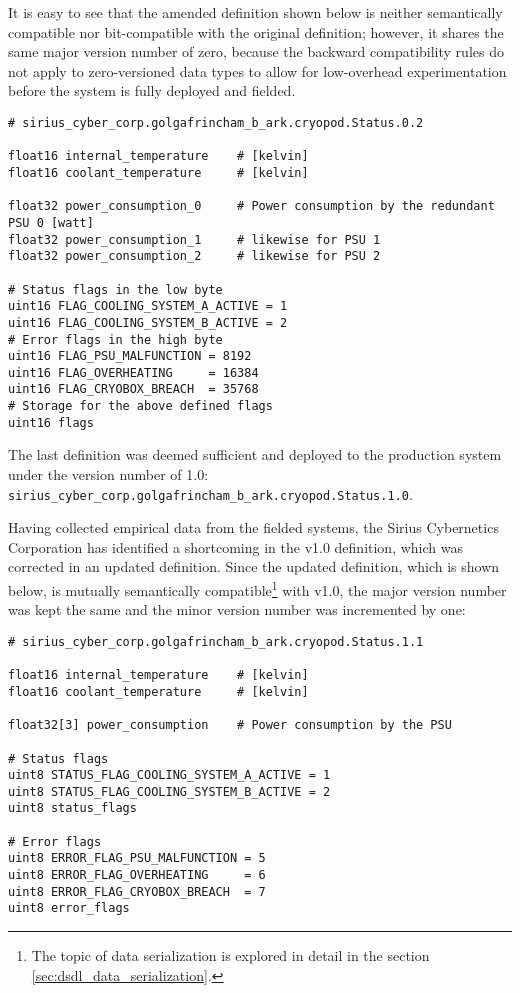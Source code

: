 It is easy to see that the amended definition shown below is neither semantically compatible nor bit-compatible
with the original definition; however, it shares the same major version number of zero, because the backward
compatibility rules do not apply to zero-versioned data types to allow for low-overhead experimentation
before the system is fully deployed and fielded.

\begin{verbatim}
# sirius_cyber_corp.golgafrincham_b_ark.cryopod.Status.0.2

float16 internal_temperature    # [kelvin]
float16 coolant_temperature     # [kelvin]

float32 power_consumption_0     # Power consumption by the redundant PSU 0 [watt]
float32 power_consumption_1     # likewise for PSU 1
float32 power_consumption_2     # likewise for PSU 2

# Status flags in the low byte
uint16 FLAG_COOLING_SYSTEM_A_ACTIVE = 1
uint16 FLAG_COOLING_SYSTEM_B_ACTIVE = 2
# Error flags in the high byte
uint16 FLAG_PSU_MALFUNCTION = 8192
uint16 FLAG_OVERHEATING     = 16384
uint16 FLAG_CRYOBOX_BREACH  = 35768
# Storage for the above defined flags
uint16 flags
\end{verbatim}

The last definition was deemed sufficient and deployed to the production system
under the version number of 1.0: \verb|sirius_cyber_corp.golgafrincham_b_ark.cryopod.Status.1.0|.

Having collected empirical data from the fielded systems, the Sirius Cybernetics Corporation has
identified a shortcoming in the v1.0 definition, which was corrected in an updated definition.
Since the updated definition, which is shown below, is mutually semantically
compatible\footnote{The topic of data serialization is explored in detail in the section
\ref{sec:dsdl_data_serialization}.}
with v1.0, the major version number was kept the same and the minor version number was incremented by one:

\begin{verbatim}
# sirius_cyber_corp.golgafrincham_b_ark.cryopod.Status.1.1

float16 internal_temperature    # [kelvin]
float16 coolant_temperature     # [kelvin]

float32[3] power_consumption    # Power consumption by the PSU

# Status flags
uint8 STATUS_FLAG_COOLING_SYSTEM_A_ACTIVE = 1
uint8 STATUS_FLAG_COOLING_SYSTEM_B_ACTIVE = 2
uint8 status_flags

# Error flags
uint8 ERROR_FLAG_PSU_MALFUNCTION = 5
uint8 ERROR_FLAG_OVERHEATING     = 6
uint8 ERROR_FLAG_CRYOBOX_BREACH  = 7
uint8 error_flags
\end{verbatim}

